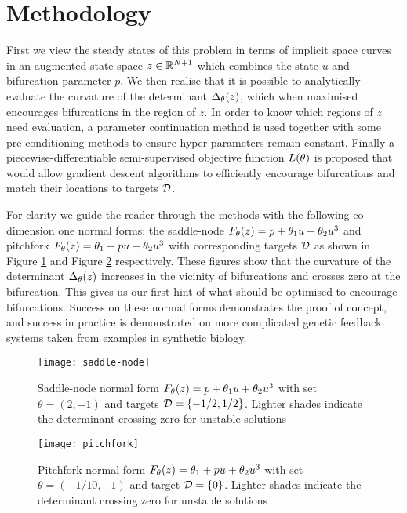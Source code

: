\section{Methodology}
First we view the steady states of this problem in terms of implicit space curves \cite{Goldman2005CurvatureSurfaces} in an augmented state space $z\in\mathbb{R}^{N+1}$ which combines the state $u$ and bifurcation parameter $p$. We then realise that it is possible to analytically evaluate the curvature of the determinant $\Delta_{\theta}(z)$, which when maximised encourages bifurcations in the region of $z$. In order to know which regions of $z$ need evaluation, a parameter continuation method \cite{Veltz2019PseudoArcLengthContinuation.jl,Farrell2016TheDiagrams} is used together with some pre-conditioning methods to ensure hyper-parameters remain constant. Finally a piecewise-differentiable semi-supervised objective function $L(\theta)$ is proposed that would allow gradient descent algorithms to efficiently encourage bifurcations and match their locations to targets $\mathcal{D}$.

For clarity we guide the reader through the methods with the following co-dimension one normal forms: the saddle-node $F_{\theta}(z) = p + \theta_{1}u+\theta_{2}u^3$ and pitchfork $F_{\theta}(z) = \theta_{1} + p u+\theta_{2}u^3$ with corresponding targets $\mathcal{D}$ as shown in Figure \ref{fig:saddle-node} and Figure \ref{fig:pitchfork} respectively. These figures show that the curvature of the determinant $\Delta_{\theta}(z)$ increases in the vicinity of bifurcations and crosses zero at the bifurcation. This gives us our first hint of what should be optimised to encourage bifurcations. Success on these normal forms demonstrates the proof of concept, and success in practice is demonstrated on more complicated genetic feedback systems taken from examples in synthetic biology.
\begin{figure}[H]
\centering{}
\captionsetup{justification=centering}
\texttt{[image: saddle-node]}
\caption{Saddle-node normal form $F_{\theta}(z) = p + \theta_{1}u+\theta_{2}u^3$ with set $\theta=(2,-1)$ and targets $\mathcal{D}=\{-1/2,1/2\}$. Lighter shades indicate the determinant crossing zero for unstable solutions}
\label{fig:saddle-node}
\end{figure}
\begin{figure}[H]
\centering{}
\captionsetup{justification=centering}
\texttt{[image: pitchfork]}
\caption{Pitchfork normal form $F_{\theta}(z) = \theta_{1} + p u+\theta_{2}u^3$ with set $\theta=(-1/10,-1)$ and target $\mathcal{D}=\{0\}$. Lighter shades indicate the determinant crossing zero for unstable solutions}
\label{fig:pitchfork}
\end{figure}

